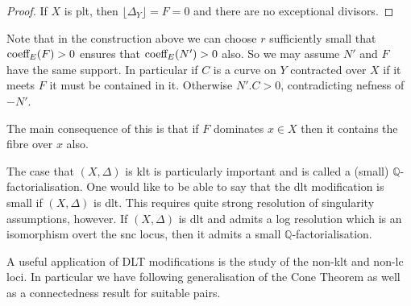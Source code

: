 \begin{proof}
	If $X$ is plt, then $\lfloor\Delta_{Y}\rfloor=F=0$ and there are no exceptional divisors.
\end{proof}


\begin{remark}\label{lc-connect}
	Note that in the construction above we can choose $r$ sufficiently small that $\textup{coeff}_{E}(F) > 0$ ensures that $\textup{coeff}_{E}(N') > 0$ also. So we may assume $N'$ and $F$ have the same support. In particular if $C$ is a curve on $Y$ contracted over $X$ if it meets $F$ it must be contained in it. Otherwise $N'.C >0$, contradicting nefness of $-N'$.
	
	The main consequence of this is that if $F$ dominates $x \in X$ then it contains the fibre over $x$ also.
	\end{remark}

The case that $(X,\Delta)$ is klt is particularly important and is called a (small) $\mathbb{Q}$-factorialisation. One would like to be able to say that the dlt modification is small if $(X,\Delta)$ is dlt. This requires quite strong resolution of singularity assumptions, however. If $(X,\Delta)$ is dlt and admits a log resolution which is an isomorphism overt the snc locus, then it admits a small $\mathbb{Q}$-factorialisation.

A useful application of DLT modifications is the study of the non-klt and non-lc loci. In particular we have following generalisation of the Cone Theorem as well as a connectedness result for suitable pairs.


